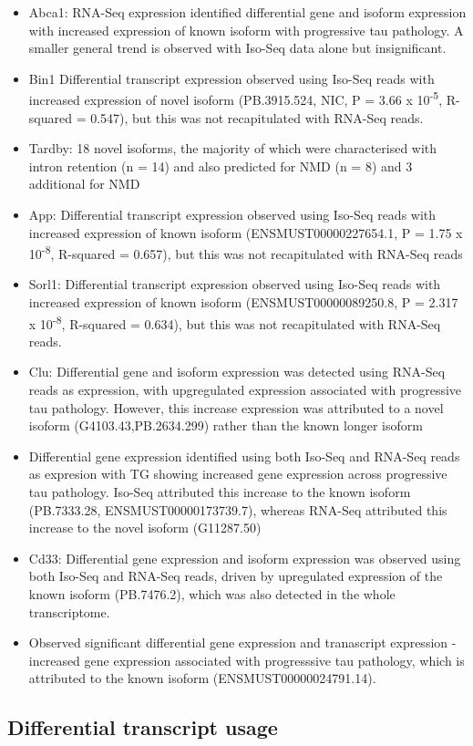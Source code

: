 \begin{itemize}
	\item Abca1: RNA-Seq expression identified differential gene and isoform expression with increased expression of known isoform with progressive tau pathology. A smaller general trend is observed with Iso-Seq data alone but insignificant.
	\item Bin1 Differential transcript expression observed using Iso-Seq reads with increased expression of novel isoform (PB.3915.524, NIC, P = 3.66 x 10\textsuperscript{-5}, R-squared = 0.547), but this was not recapitulated with RNA-Seq reads.
	\item Tardby: 18 novel isoforms, the majority of which were characterised with intron retention (n = 14) and also predicted for NMD (n = 8) and 3 additional for NMD
	\item App: Differential transcript expression observed using Iso-Seq reads with increased expression of known isoform (ENSMUST00000227654.1, P = 1.75 x 10\textsuperscript{-8}, R-squared = 0.657), but this was not recapitulated with RNA-Seq reads
	\item Sorl1: Differential transcript expression observed using Iso-Seq reads with increased expression of known isoform (ENSMUST00000089250.8, P = 2.317 x 10\textsuperscript{-8}, R-squared = 0.634), but this was not recapitulated with RNA-Seq reads.
	\item Clu: Differential gene and isoform expression was detected using RNA-Seq reads as expression, with upgregulated expression associated with progressive tau pathology. However, this increase expression was attributed to a novel isoform (G4103.43,PB.2634.299) rather than the known longer isoform
	\item Differential gene expression identified using both Iso-Seq and RNA-Seq reads as expresion with TG showing increased gene expression across progressive tau pathology. Iso-Seq attributed this increase to the known isoform (PB.7333.28, ENSMUST00000173739.7), whereas RNA-Seq attributed this increase to the novel isoform (G11287.50)
	\item Cd33: Differential gene expression and isoform expression was observed using both Iso-Seq and RNA-Seq reads, driven by upregulated expression of the known isoform (PB.7476.2), which was also detected in the whole transcriptome. 
	\item Observed significant differential gene expression and tranascript expression - increased gene expression associated with progresssive tau pathology, which is attributed to the known isoform (ENSMUST00000024791.14).
\end{itemize}

\subsection{Differential transcript usage}


